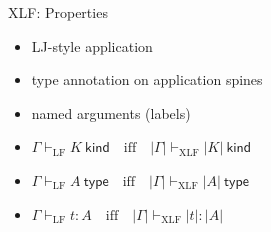 \documentclass[ignorenonframetext,red]{beamer}
\newcommand\jlangt[4]{{#2}\vdash_{\mathrm{#1}}{#3}:{#4}}
\newcommand\jlangA[3]{{#2}\vdash_{\mathrm{#1}}{#3}\mathsf{\ type}}
\newcommand\jlangK[3]{{#2}\vdash_{\mathrm{#1}}{#3}\mathsf{\ kind}}
\newcommand\jlft[3]{\jlangt{LF}{#1}{#2}{#3}}
\newcommand\jlfA[2]{\jlangA{LF}{#1}{#2}}
\newcommand\jlfK[2]{\jlangK{LF}{#1}{#2}}
\newcommand\jxlft[3]{\jlangt{XLF}{#1}{#2}{#3}}
\newcommand\jxlfA[2]{\jlangA{XLF}{#1}{#2}}
\newcommand\jxlfK[2]{\jlangK{XLF}{#1}{#2}}
\begin{document}
\begin{frame}{XLF: Properties}
  \begin{itemize}
  \item LJ-style application
  \item type annotation on application spines
  \item named arguments (labels)
  \end{itemize}
  \begin{lemma}[Conservativity]
    \begin{itemize}
    \item $\jlfK \Gamma K \quad\text{iff}\quad \jxlfK {|\Gamma|} {|K|}$
    \item $\jlfA \Gamma A \quad\text{iff}\quad \jxlfA {|\Gamma|} {|A|}$
    \item $\jlft \Gamma t A \quad\text{iff}\quad \jxlft {|\Gamma|} {|t|} {|A|}$
    \end{itemize}
  \end{lemma}
\end{frame}
\end{document}
